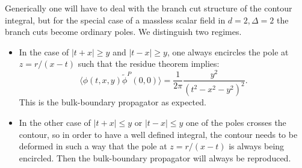 \documentclass{PoS}
\newcommand{\LF}{\left(}
\newcommand{\RF}{\right)}
\begin{document}
Generically one will have to deal with the branch cut structure of the contour integral, but for the special case of a massless scalar field in $d=2,\Delta=2$ the branch cuts become ordinary poles. 
We distinguish two regimes.
\begin{itemize}
\item In the case of $\left|t+x\right|\geq y$ and $\left|t-x\right| \geq y$, one always encircles the pole at $z= r/(x-t)$ such that the residue theorem implies:
\begin{equation}
\langle \phi(t,x,y) \tilde{\phi}^P(0,0)\rangle = \frac{1}{2\pi} \frac{ y^2}{\LF t^2-x^2-y^2\RF^2}.
\end{equation}
This is the bulk-boundary propagator as expected.
\item In the other case of $\left|t+x\right|\leq y$ or $\left|t-x\right|\leq y$ one of the poles crosses the contour, so in order to have a well defined integral, the contour needs to be deformed in such a way that the pole at $z=r/(x-t)$ is always being encircled. Then the bulk-boundary propagator will always be reproduced.
\end{itemize}
\end{document}
